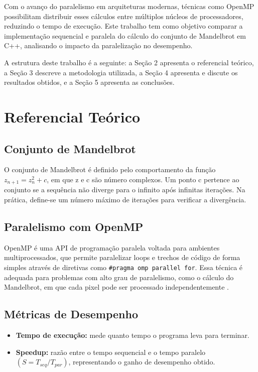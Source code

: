 \documentclass[12pt]{article}
\begin{document}
Com o avanço do paralelismo em arquiteturas modernas, técnicas como OpenMP possibilitam distribuir esses cálculos entre múltiplos núcleos de processadores, reduzindo o tempo de execução. Este trabalho tem como objetivo comparar a implementação sequencial e paralela do cálculo do conjunto de Mandelbrot em C++, analisando o impacto da paralelização no desempenho.

A estrutura deste trabalho é a seguinte: a Seção 2 apresenta o referencial teórico, a Seção 3 descreve a metodologia utilizada, a Seção 4 apresenta e discute os resultados obtidos, e a Seção 5 apresenta as conclusões.

\section{Referencial Teórico} \label{sec:referencial_teorico}
\subsection{Conjunto de Mandelbrot}

O conjunto de Mandelbrot é definido pelo comportamento da função $z_{n+1} = z_{n}^{2} + c$, em que z e c são número complexos. Um ponto c pertence ao conjunto se a sequência não diverge para o infinito após infinitas iterações. Na prática, define-se um número máximo de iterações para verificar a divergência.

\subsection{Paralelismo com OpenMP}

OpenMP é uma API de programação paralela voltada para ambientes multiprocessados, que permite paralelizar loops e trechos de código de forma simples através de diretivas como \texttt{\#pragma omp parallel for}. Essa técnica é adequada para problemas com alto grau de paralelismo, como o cálculo do Mandelbrot, em que cada pixel pode ser processado independentemente \cite{omp:mandelbrot}. 

\subsection{Métricas de Desempenho}

\begin{itemize}
  \item \textbf{Tempo de execução:} mede quanto tempo o programa leva para terminar.
  \item \textbf{Speedup:} razão entre o tempo sequencial e o tempo paralelo $(S = T_{seq} / T_{par})$, representando o ganho de desempenho obtido.
\end{itemize}
\end{document}

